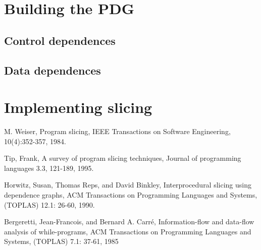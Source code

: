 \documentclass[oneside,12pt,a4paper]{book}
\begin{document}
\section{Building the PDG}
\subsection{Control dependences}
\subsection{Data dependences}

\section{Implementing slicing}


\begin{thebibliography}{Textttext}
  M. Weiser,
  Program slicing,
  IEEE Transactions on Software Engineering,
  10(4):352-357,
  1984.

  Tip, Frank,
  A survey of program slicing techniques,
  Journal of programming languages 3.3,
  121-189,
  1995. 

  Horwitz, Susan, Thomas Reps, and David Binkley,
  Interprocedural slicing using dependence graphs, 
  ACM Transactions on Programming Languages and Systems,
  (TOPLAS) 12.1: 26-60,
  1990.

  Bergeretti, Jean-Francois, and Bernard A. Carré,
  Information-flow and data-flow analysis of while-programs,
  ACM Transactions on Programming Languages and Systems,
  (TOPLAS) 7.1: 37-61,
  1985

\end{thebibliography}
\end{document}
